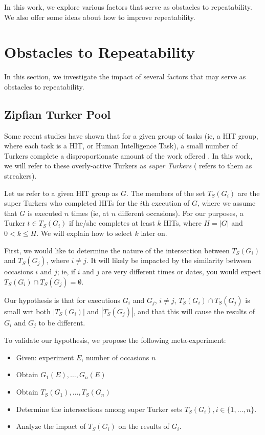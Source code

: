 \documentclass[letterpaper]{article}
\begin{document}
In this work, we explore various factors that serve as obstacles to repeatability.  We also offer some ideas about how to improve repeatability.

\section{Obstacles to Repeatability}

In this section, we investigate the impact of several factors that may serve as obstacles to repeatability.

\subsection{Zipfian Turker Pool}
Some recent studies have shown that for a given group of tasks (ie, a HIT group, where each task is a HIT, or Human Intelligence Task), a small number of Turkers complete a disproportionate amount of the work offered \cite{Franklin:2011, Heer:2010}.  In this work, we will refer to these overly-active Turkers as \textit{super Turkers} (\cite{Heer:2010} refers to them as streakers).

Let us refer to a given HIT group as \(G\).  The members of the set \(T_S(G_i)\) are the super Turkers who completed HITs for the \(i\)th execution of \(G\), where we assume that \(G\) is executed \(n\) times (ie, at \(n\) different occasions).  For our purposes, a Turker \(t \in T_S(G_i)\) if he/she completes at least \(k\) HITs, where \(H = |G|\) and \(0 < k \le H\).  We will explain how to select \(k\) later on.  %

First, we would like to determine the nature of the intersection between \(T_S(G_i)\) and \(T_S(G_j)\), where \(i \ne j\).  It will likely be impacted by the similarity between occasions \(i\) and \(j\); ie, if \(i\) and \(j\) are very different times or dates, you would expect \(T_S(G_i) \cap T_S(G_j) = \emptyset\).

Our hypothesis is that for executions \(G_i\) and \(G_j\), \(i \ne j\), \(T_S(G_i) \cap T_S(G_j)\) is small wrt both \(|T_S(G_i)|\) and \(|T_S(G_j)|\), and that this will cause the results of \(G_i\) and \(G_j\) to be different.  %

To validate our hypothesis, we propose the following meta-experiment:
\begin{itemize}
\item Given:  experiment \(E\), number of occasions \(n\)
\item Obtain \(G_1(E), \dots, G_n(E)\)
\item Obtain \(T_S(G_1), \dots, T_S(G_n)\)
\item Determine the intersections among super Turker sets \(T_S(G_i), i \in \{1, \dots, n\} \).
\item Analyze the impact of \(T_S(G_i)\) on the results of \(G_i\).
\end{itemize}
\end{document}
